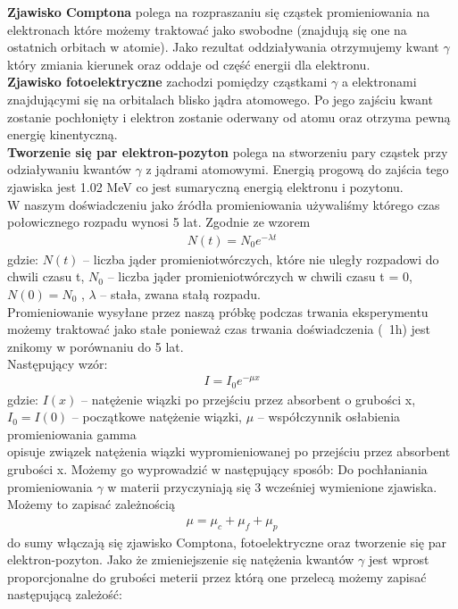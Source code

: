 \documentclass[a4paper]{article}
\newlength{\du}
\begin{document}
\textbf{Zjawisko Comptona} polega na rozpraszaniu się cząstek promieniowania na elektronach które możemy traktować jako swobodne (znajdują się one na ostatnich orbitach w atomie). Jako rezultat oddziaływania otrzymujemy kwant $\gamma$ który zmiania kierunek oraz oddaje od część energii dla elektronu.\\
\textbf{Zjawisko fotoelektryczne} zachodzi pomiędzy cząstkami $\gamma$ a elektronami znajdującymi się na orbitalach blisko jądra atomowego. Po jego zajściu kwant zostanie pochłonięty i elektron zostanie oderwany od atomu oraz otrzyma pewną energię kinentyczną.\\
 \textbf{Tworzenie się par elektron-pozyton} polega na stworzeniu pary cząstek przy odziaływaniu kwantów $\gamma$ z jądrami atomowymi. Energią progową do zajścia tego zjawiska jest 1.02 MeV co jest sumaryczną energią elektronu i pozytonu.\\
W naszym doświadczeniu jako źródła promieniowania używaliśmy  którego czas połowicznego rozpadu wynosi 5 lat. Zgodnie ze wzorem 
\begin{align*}
N(t) = N_0 e^{−\lambda t}
\end{align*}
gdzie:
$N(t)$ – liczba jąder promieniotwórczych, które nie uległy rozpadowi do chwili czasu t,
$N_0$ – liczba jąder promieniotwórczych w chwili czasu t = 0, $N(0) = N_0$ , $\lambda$ – stała, zwana stałą rozpadu.\\
Promieniowanie wysyłane przez naszą próbkę podczas trwania eksperymentu możemy traktować jako stałe ponieważ czas trwania doświadczenia (~1h) jest znikomy w porównaniu do 5 lat.\\
Następujący wzór:
\begin{align*}
I = I_0 e^{− \mu  x}
\end{align*}
gdzie: $I(x)$ – natężenie wiązki po przejściu przez absorbent o grubości x, $I_0 = I(0)$ – początkowe natężenie
wiązki, $\mu$ – współczynnik osłabienia promieniowania gamma\\
opisuje związek natężenia wiązki wypromieniowanej po przejściu przez absorbent grubości x. Możemy go wyprowadzić w następujący sposób:
Do pochłaniania promieniowania $\gamma$ w materii przyczyniają się 3 wcześniej wymienione zjawiska. Możemy to zapisać zależnością
\begin{align*}
\mu = \mu_c +\mu_f +\mu_p
\end{align*}
do sumy włączają się zjawisko Comptona, fotoelektryczne oraz tworzenie się par elektron-pozyton.
Jako że zmieniejszenie się natężenia kwantów $\gamma$ jest wprost proporcjonalne do grubości meterii przez którą one przelecą możemy zapisać następującą zależość:
\end{document}
